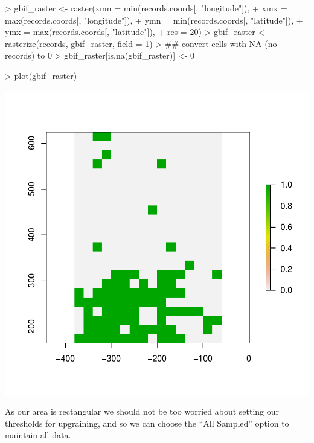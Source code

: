 \documentclass{article}[12pt, a4paper]
\begin{document}
\begin{Schunk}
\begin{Sinput}
> gbif_raster <- raster(xmn = min(records.coords[, "longitude"]),
+                       xmx = max(records.coords[, "longitude"]),
+                       ymn = min(records.coords[, "latitude"]),
+                       ymx = max(records.coords[, "latitude"]),
+                       res = 20)
> gbif_raster <- rasterize(records, gbif_raster, field = 1)
> ## convert cells with NA (no records) to 0
> gbif_raster[is.na(gbif_raster)] <- 0
\end{Sinput}
\end{Schunk}
\begin{Schunk}
\begin{Sinput}
> plot(gbif_raster)
\end{Sinput}
\end{Schunk}
\includegraphics{Downscaling-downscale32}

As our area is rectangular we should not be too worried about setting our thresholds for upgraining, and so we can choose the “All Sampled” option to maintain all data.
\end{document}

